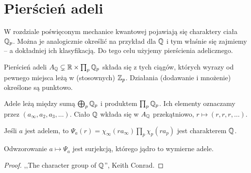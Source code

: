 \section{Pierścień adeli}
W  rozdziale poświęconym mechanice kwantowej pojawiają się charaktery ciała $\mathbb Q_p$.
Można je analogicznie określić na przykład dla $\mathbb Q$ i tym właśnie się zajmiemy -- a dokładniej ich klasyfikacją.
Do tego celu użyjemy pierścienia adelicznego.

\begin{definicja}
	Pierścień adeli $A_\mathbb Q \subsetneq \mathbb R \times \prod_p \mathbb Q_p$ składa się z tych ciągów, których wyrazy od pewnego miejsca leżą w (stosownych) $\mathbb Z_p$.
	Działania (dodawanie i mnożenie) określone są punktowo.
\end{definicja}

Adele leżą między sumą $\bigoplus_p \mathbb Q_p$ i produktem $\prod_p \mathbb Q_p$.
Ich elementy oznaczamy przez $(a_\infty, a_2, a_3, \ldots)$.
Ciało $\mathbb Q$ wkłada się w $A_\mathbb Q$ przekątniowo, $r \mapsto (r, r, r, \ldots)$.

\begin{definicja}
	Jeśli $a$ jest adelem, to $\Psi_a(r) = \chi_\infty(r a_\infty) \prod_p \chi_p(r a_p)$ jest charakterem $\mathbb Q$.
\end{definicja}

\begin{fakt}
	Odwzorowanie $a \mapsto \Psi_a$ jest surjekcją, którego jądro to wymierne adele.
\end{fakt}

\begin{proof}
	,,The character group of $\mathbb Q$'', Keith Conrad.
\end{proof}